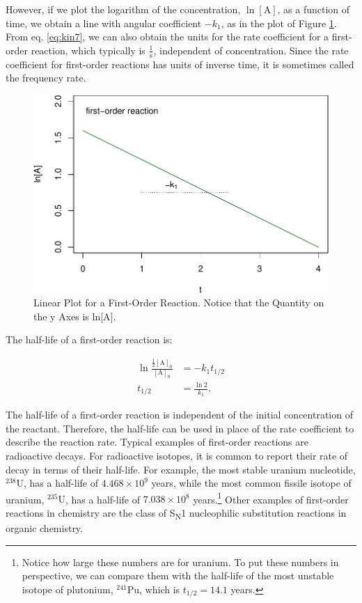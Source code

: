 \documentclass[
  9pt,
]{extbook}
\theoremstyle{definition}
\theoremstyle{definition}
\theoremstyle{definition}
\theoremstyle{remark}
\begin{document}
However, if we plot the logarithm of the concentration, \(\ln[\mathrm{A}]\), as a function of time, we obtain a line with angular coefficient \(-k_1\), as in the plot of Figure \ref{fig:figk3}. From eq. \eqref{eq:kin7}, we can also obtain the units for the rate coefficient for a first-order reaction, which typically is \(\frac{1}{\mathrm{s}}\), independent of concentration. Since the rate coefficient for first-order reactions has units of inverse time, it is sometimes called the frequency rate.

\begin{figure}

{\centering \includegraphics{pchem1_files/figure-latex/figk3-1} 

}

\caption{Linear Plot for a First-Order Reaction. Notice that the Quantity on the y Axes is ln[A].}\label{fig:figk3}
\end{figure}

The half-life of a first-order reaction is:

\begin{equation}
\begin{aligned}
\ln \frac{\frac{1}{2}[\mathrm{A}]_0}{[\mathrm{A}]_0}&=-k_1 t_{1/2}\\
t_{1/2} &= \frac{\ln 2}{k_1}.
\end{aligned}
\label{eq:kin8}
\end{equation}

The half-life of a first-order reaction is independent of the initial concentration of the reactant. Therefore, the half-life can be used in place of the rate coefficient to describe the reaction rate. Typical examples of first-order reactions are radioactive decays. For radioactive isotopes, it is common to report their rate of decay in terms of their half-life. For example, the most stable uranium nucleotide, \(^{238}\mathrm{U}\), has a half-life of \(4.468\times 10^9\) years, while the most common fissile isotope of uranium, \(^{235}\mathrm{U}\), has a half-life of \(7.038\times 10^8\) years.\footnote{Notice how large these numbers are for uranium. To put these numbers in perspective, we can compare them with the half-life of the most unstable isotope of plutonium, \(^{241}\mathrm{Pu}\), which is \(t_{1/2}=14.1\) years.} Other examples of first-order reactions in chemistry are the class of S\textsubscript{N}1 nucleophilic substitution reactions in organic chemistry.
\end{document}
